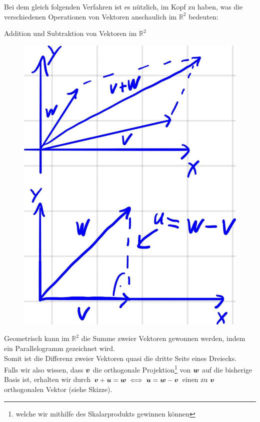 \newpage
Bei dem gleich folgenden Verfahren ist es nützlich, im Kopf zu haben, was die verschiedenen Operationen von Vektoren anschaulich im $\mathbb{R}^2$ bedeuten:
\begin{Wiederholung}
{Addition und Subtraktion von Vektoren im $\mathbb{R}^2$}
\begin{figure}
 \vspace{-15pt}
\includegraphics[width=.15\textwidth]{Dateien/04/04Vektoraddition.jpg}
 \vspace{-15pt}
\end{figure}
Geometrisch kann im $\mathbb{R}^2$ die Summe zweier Vektoren gewonnen werden, indem ein Parallelogramm gezeichnet wird.\\
Somit ist die Differenz zweier Vektoren quasi die dritte Seite eines Dreiecks.\\
Falls wir also wissen, dass ${{\text{\boldmath${v}$}}}$ die orthogonale Projektion\footnote{welche wir mithilfe des Skalarprodukts gewinnen können} von ${{\text{\boldmath${w}$}}}$ auf die bisherige Basis ist, erhalten wir durch ${{\text{\boldmath${v}$}}}+{{\text{\boldmath${u}$}}}={{\text{\boldmath${w}$}}}\iff {{\text{\boldmath${u}$}}}={{\text{\boldmath${w}$}}}-{{\text{\boldmath${v}$}}}$ einen zu ${{\text{\boldmath${v}$}}}$ orthogonalen Vektor (siehe Skizze).
\end{Wiederholung}
